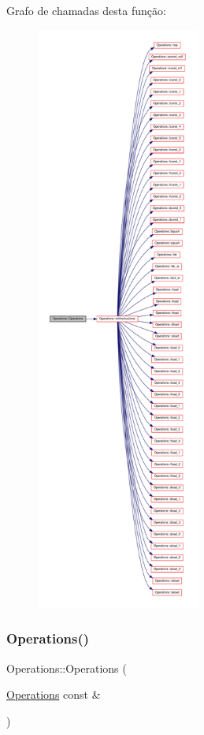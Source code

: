 Grafo de chamadas desta função\+:\nopagebreak
\begin{figure}[H]
\begin{center}
\leavevmode
\includegraphics[height=550pt]{classOperations_af344ca561c1a08118f686551abb08efb_cgraph}
\end{center}
\end{figure}
\mbox{\label{classOperations_a83982c91620aa947b25b106d78d51e90}} 
\subsubsection{\texorpdfstring{Operations()}{Operations()}\hspace{0.1cm}{\footnotesize\ttfamily [2/2]}}
{\footnotesize\ttfamily Operations\+::\+Operations (\begin{DoxyParamCaption}\item[{\hyperlink{classOperations}{Operations} const \&}]{ }\end{DoxyParamCaption})\hspace{0.3cm}{\ttfamily [private]}}



